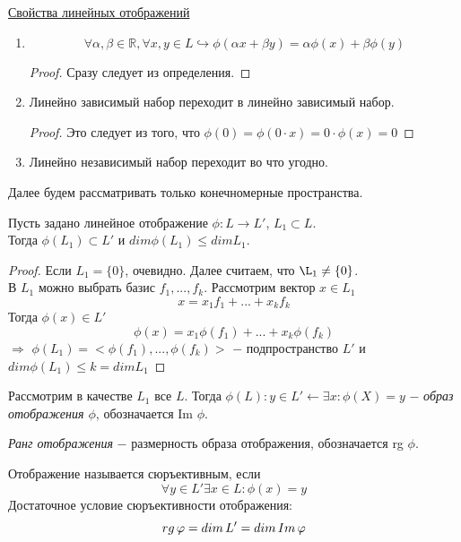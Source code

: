 \underline{Свойства линейных отображений}
\begin{enumerate}
    \item \[
        \forall \alpha, \beta \in \mathbb{R}, \forall x, y \in L \hookrightarrow \phi(\alpha x + \beta y) = \alpha\phi(x) + \beta\phi(y)
        \]
        \begin{proof}
            Сразу следует из определения.
        \end{proof}
    \item Линейно зависимый набор переходит в линейно зависимый набор.
    \begin{proof}
        Это следует из того, что $\phi(0) = \phi(0 \cdot x) = 0 \cdot \phi(x) =  0$
    \end{proof}
    \item Линейно независимый набор переходит во что угодно.
\end{enumerate}

Далее будем рассматривать только конечномерные пространства.

\begin{theorem}
    Пусть задано линейное отображение $\phi : L \longrightarrow L'$, $L_1 \subset L$.\\ Тогда $\phi(L_1) \subset L'$ и $ dim \phi(L_1) \leq dim L_1$.
\end{theorem}
\begin{proof}
    Если $L_1 = \{0\}$, очевидно. Далее считаем, что $\L_1 \neq \{0\}$.\\
    В $L_1$ можно выбрать базис $f_1, ..., f_k$. Рассмотрим вектор $x \in L_1$
    \[
    x = x_1f_1 + ... + x_kf_k
    \]
    Тогда $\phi(x) \in L'$ 
    \[
    \phi(x) = x_1\phi(f_1) + ... + x_k\phi(f_k)
    \]
    $\Longrightarrow$ $\phi(L_1) = <\phi(f_1), ..., \phi(f_k)>$ $-$ подпространство $L'$ и $dim \phi(L_1) \leq k = dim L_1$
\end{proof}

\begin{definition}
    Рассмотрим в качестве $L_1$ все $L$. Тогда $\phi(L) : y \in L' \longleftarrow \exists x : \phi(X) = y$ $-$ \textit{образ отображения $\phi$}, обозначается Im $\phi$.
\end{definition}

\begin{definition}
    \textit{Ранг отображения} $-$ размерность образа отображения, обозначается rg $\phi$.
\end{definition}

\begin{definition}
    Отображение называется сюръективным, если
    \[
    \forall y \in L' \exists x \in L : \phi(x) = y
    \]
    Достаточное условие сюръективности отображения:
    \[
    rg\thinspace\phi = dim\thinspace L' = dim\thinspace Im\thinspace\phi
    \]
\end{definition}

